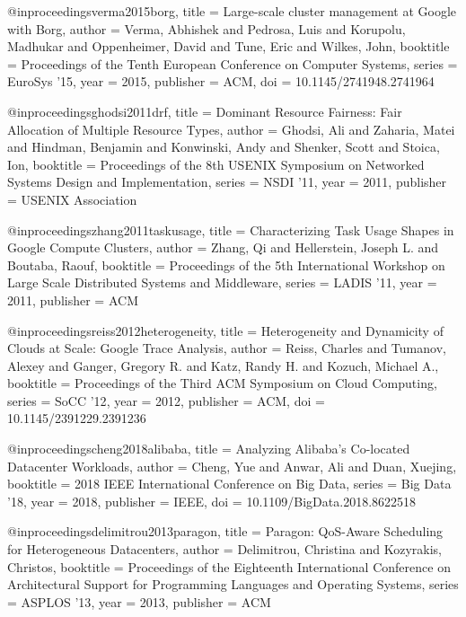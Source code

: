 @inproceedings{verma2015borg,
  title        = {Large-scale cluster management at Google with Borg},
  author       = {Verma, Abhishek and Pedrosa, Luis and Korupolu, Madhukar and Oppenheimer, David and Tune, Eric and Wilkes, John},
  booktitle    = {Proceedings of the Tenth European Conference on Computer Systems},
  series       = {EuroSys '15},
  year         = {2015},
  publisher    = {ACM},
  doi          = {10.1145/2741948.2741964}
}

@inproceedings{ghodsi2011drf,
  title        = {Dominant Resource Fairness: Fair Allocation of Multiple Resource Types},
  author       = {Ghodsi, Ali and Zaharia, Matei and Hindman, Benjamin and Konwinski, Andy and Shenker, Scott and Stoica, Ion},
  booktitle    = {Proceedings of the 8th USENIX Symposium on Networked Systems Design and Implementation},
  series       = {NSDI '11},
  year         = {2011},
  publisher    = {USENIX Association}
}

@inproceedings{zhang2011taskusage,
  title        = {Characterizing Task Usage Shapes in Google Compute Clusters},
  author       = {Zhang, Qi and Hellerstein, Joseph L. and Boutaba, Raouf},
  booktitle    = {Proceedings of the 5th International Workshop on Large Scale Distributed Systems and Middleware},
  series       = {LADIS '11},
  year         = {2011},
  publisher    = {ACM}
}

@inproceedings{reiss2012heterogeneity,
  title        = {Heterogeneity and Dynamicity of Clouds at Scale: Google Trace Analysis},
  author       = {Reiss, Charles and Tumanov, Alexey and Ganger, Gregory R. and Katz, Randy H. and Kozuch, Michael A.},
  booktitle    = {Proceedings of the Third ACM Symposium on Cloud Computing},
  series       = {SoCC '12},
  year         = {2012},
  publisher    = {ACM},
  doi          = {10.1145/2391229.2391236}
}

@inproceedings{cheng2018alibaba,
  title        = {Analyzing Alibaba's Co-located Datacenter Workloads},
  author       = {Cheng, Yue and Anwar, Ali and Duan, Xuejing},
  booktitle    = {2018 IEEE International Conference on Big Data},
  series       = {Big Data '18},
  year         = {2018},
  publisher    = {IEEE},
  doi          = {10.1109/BigData.2018.8622518}
}

@inproceedings{delimitrou2013paragon,
  title        = {Paragon: QoS-Aware Scheduling for Heterogeneous Datacenters},
  author       = {Delimitrou, Christina and Kozyrakis, Christos},
  booktitle    = {Proceedings of the Eighteenth International Conference on Architectural Support for Programming Languages and Operating Systems},
  series       = {ASPLOS '13},
  year         = {2013},
  publisher    = {ACM}
}

